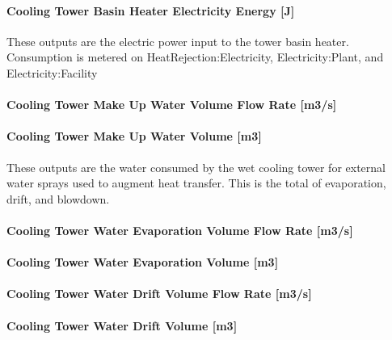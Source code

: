 \paragraph{Cooling Tower Basin Heater Electricity Energy {[}J{]}}\label{cooling-tower-basin-heater-electric-energy-j-2}

These outputs are the electric power input to the tower basin heater. Consumption is metered on HeatRejection:Electricity, Electricity:Plant, and Electricity:Facility

\paragraph{Cooling Tower Make Up Water Volume Flow Rate {[}m3/s{]}}\label{cooling-tower-make-up-water-volume-flow-rate-m3s-2}

\paragraph{Cooling Tower Make Up Water Volume {[}m3{]}}\label{cooling-tower-make-up-water-volume-m3-2}

These outputs are the water consumed by the wet cooling tower for external water sprays used to augment heat transfer. This is the total of evaporation, drift, and blowdown.

\paragraph{Cooling Tower Water Evaporation Volume Flow Rate {[}m3/s{]}}\label{cooling-tower-water-evaporation-volume-flow-rate-m3s-2}

\paragraph{Cooling Tower Water Evaporation Volume {[}m3{]}}\label{cooling-tower-water-evaporation-volume-m3-2}

\paragraph{Cooling Tower Water Drift Volume Flow Rate {[}m3/s{]}}\label{cooling-tower-water-drift-volume-flow-rate-m3s-2}

\paragraph{Cooling Tower Water Drift Volume {[}m3{]}}\label{cooling-tower-water-drift-volume-m3-2}

